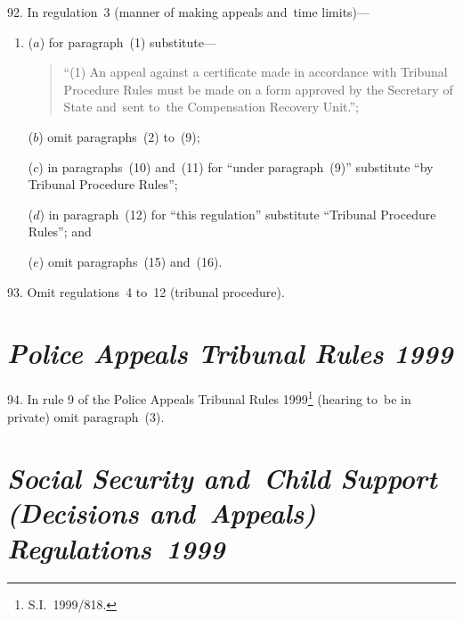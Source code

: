 \documentclass[12pt,a4paper]{article}
\begin{document}
\medskip

92.  In regulation~3 (manner of making appeals and~time limits)—
\begin{enumerate}\item[]
($a$) for paragraph~(1) substitute—
\begin{quotation}
“(1) An appeal against a certificate made in accordance with Tribunal Procedure Rules must be made on a form approved by the Secretary of State and~sent to~the Compensation Recovery Unit.”;
\end{quotation}

($b$) omit paragraphs~(2) to~(9);

($c$) in paragraphs~(10) and~(11) for “under paragraph~(9)” substitute “by Tribunal Procedure Rules”;

($d$) in paragraph~(12) for “this regulation” substitute “Tribunal Procedure Rules”; and

($e$) omit paragraphs~(15) and~(16).
\end{enumerate}

\medskip

93.  Omit regulations~4 to~12 (tribunal procedure).

\section*{\itshape Police Appeals Tribunal Rules 1999}

94.  In rule 9 of the Police Appeals Tribunal Rules 1999\footnote{S.I.~1999/818.} (hearing to~be in private) omit paragraph~(3).

\vfill

\section*{\itshape Social Security and~Child Support (Decisions and~Appeals) Regulations~1999}
\end{document}

